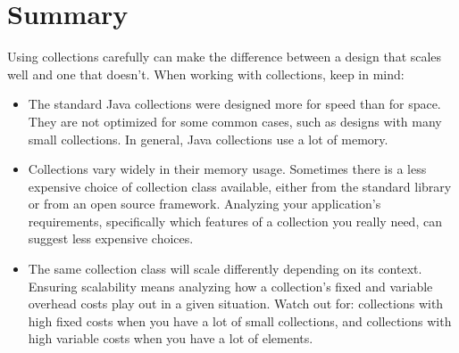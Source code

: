 \section{Summary}
Using collections carefully can
make the difference between a design that scales well and one that
doesn't. When working with collections, keep in mind:
\begin{itemize}
  \item The standard Java collections were designed more for speed than for
  space. They are not optimized for some common cases, such as designs with many small
  collections. In general, Java collections use a lot of memory.
  \item Collections vary widely in their memory usage. Sometimes there is a less
  expensive choice of collection class available, either from the standard
  library or from an open source framework. Analyzing your application's requirements, specifically
  which features of a collection you really need, can suggest
  less expensive choices.
  \item The same collection class will scale differently depending on its
  context. Ensuring scalability means
  analyzing how a collection's fixed and variable overhead costs
  play out in a given situation. Watch out for: collections with
  high fixed costs when you have a lot of small collections, and 
  collections with high variable costs when you have a
  lot of elements.
\end{itemize}
